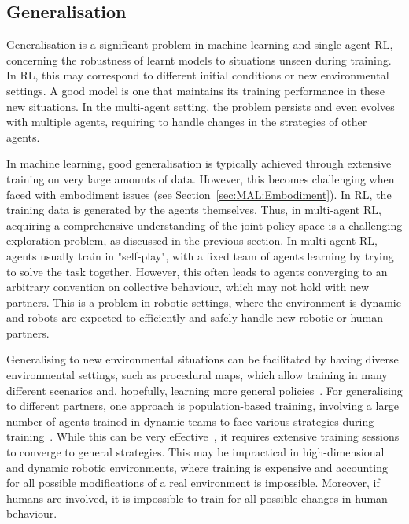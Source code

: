\subsection{Generalisation}\label{sec:MADRL:Generalisation}

Generalisation is a significant problem in machine learning and single-agent RL, concerning the robustness of learnt models to situations unseen during training. In RL, this may correspond to different initial conditions or new environmental settings. A good model is one that maintains its training performance in these new situations. In the multi-agent setting, the problem persists and even evolves with multiple agents, requiring to handle changes in the strategies of other agents. 

In machine learning, good generalisation is typically achieved through extensive training on very large amounts of data. However, this becomes challenging when faced with embodiment issues (see Section~\ref{sec:MAL:Embodiment}). In RL, the training data is generated by the agents themselves. Thus, in multi-agent RL, acquiring a comprehensive understanding of the joint policy space is a challenging exploration problem, as discussed in the previous section. In multi-agent RL, agents usually train in "self-play", with a fixed team of agents learning by trying to solve the task together. However, this often leads to agents converging to an arbitrary convention on collective behaviour, which may not hold with new partners. This is a problem in robotic settings, where the environment is dynamic and robots are expected to efficiently and safely handle new robotic or human partners. 

Generalising to new environmental situations can be facilitated by having diverse environmental settings, such as procedural maps, which allow training in many different scenarios and, hopefully, learning more general policies~\citep{Jaderberg2018_FTW, Cobbe2020_ProcGen}. For generalising to different partners, one approach is population-based training, involving a large number of agents trained in dynamic teams to face various strategies during training~\citep{Jaderberg2018_FTW, Liu2019_CoordThroughComp, Zhao2023_MaxEntropPop}. While this can be very effective~\citep{Jaderberg2018_FTW}, it requires extensive training sessions to converge to general strategies. This may be impractical in high-dimensional and dynamic robotic environments, where training is expensive and accounting for all possible modifications of a real environment is impossible. Moreover, if humans are involved, it is impossible to train for all possible changes in human behaviour. 

